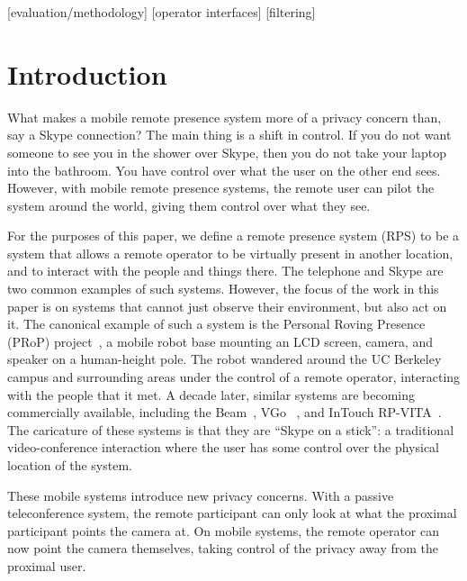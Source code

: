 \documentclass{acm_proc_article-sp}
\begin{document}
[evaluation/methodology]
[operator interfaces]
[filtering]



\section{Introduction}
What makes a mobile remote presence system more of a privacy concern than, say a Skype connection?  The main thing is a shift in control.  If you do not want someone to see you in the shower over Skype, then you do not take your laptop into the bathroom.  You have control over what the user on the other end sees.  However, with mobile remote presence systems, the remote user can pilot the system around the world, giving them control over what they see.

For the purposes of this paper, we define a remote presence system (RPS) to be a system that allows a remote operator to be virtually present in another location, and to interact with the people and things there.  The telephone and Skype are two common examples of such systems.  However, the focus of the work in this paper is on systems that cannot just observe their environment, but also act on it.  The canonical example of such a system is the Personal Roving Presence (PRoP) project~\cite{Paulos:2001}, a mobile robot base mounting an LCD screen, camera, and speaker on a human-height pole.  The robot wandered around the UC Berkeley campus and surrounding areas under the control of a remote operator, interacting with the people that it met.  A decade later, similar systems are becoming commercially available, including the Beam~\cite{SuitableTech:2012}, VGo ~\cite{VGo:2012}, and InTouch RP-VITA~\cite{InTouch:2012}.  The caricature of these systems is that they are ``Skype on a stick'':  a traditional video-conference interaction where the user has some control over the physical location of the system.

These mobile systems introduce new privacy concerns.  With a passive teleconference system, the remote participant can only look at what the proximal participant points the camera at.  On mobile systems, the remote operator can now point the camera themselves, taking control of the privacy away from the proximal user.
\end{document}
